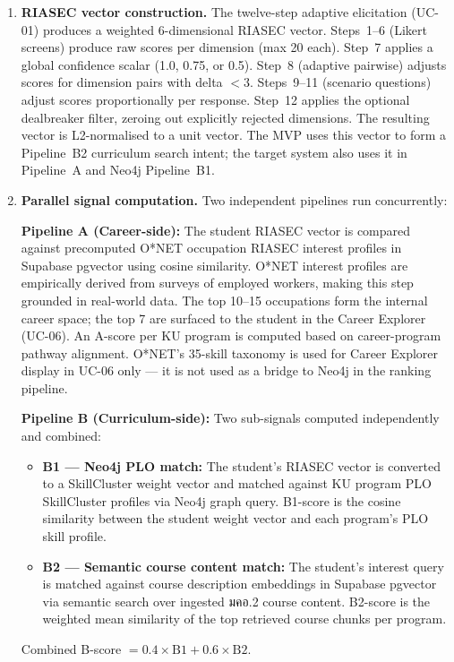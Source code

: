 \begin{enumerate}[leftmargin=80pt]
    \item \textbf{RIASEC vector construction.} The twelve-step adaptive elicitation (UC-01) produces a weighted 6-dimensional RIASEC vector. Steps~1--6 (Likert screens) produce raw scores per dimension (max 20 each). Step~7 applies a global confidence scalar (1.0, 0.75, or 0.5). Step~8 (adaptive pairwise) adjusts scores for dimension pairs with delta $< 3$. Steps~9--11 (scenario questions) adjust scores proportionally per response. Step~12 applies the optional dealbreaker filter, zeroing out explicitly rejected dimensions. The resulting vector is L2-normalised to a unit vector. The MVP uses this vector to form a Pipeline~B2 curriculum search intent; the target system also uses it in Pipeline~A and Neo4j Pipeline~B1.

    \item \textbf{Parallel signal computation.} Two independent pipelines run concurrently:

    \textbf{Pipeline A (Career-side):} The student RIASEC vector is compared against precomputed O*NET occupation RIASEC interest profiles in Supabase pgvector using cosine similarity. O*NET interest profiles are empirically derived from surveys of employed workers, making this step grounded in real-world data. The top 10--15 occupations form the internal career space; the top 7 are surfaced to the student in the Career Explorer (UC-06). An A-score per KU program is computed based on career-program pathway alignment. O*NET's 35-skill taxonomy is used for Career Explorer display in UC-06 only --- it is not used as a bridge to Neo4j in the ranking pipeline.

    \textbf{Pipeline B (Curriculum-side):} Two sub-signals computed independently and combined:
    \begin{itemize}[leftmargin=40pt]
        \item \textbf{B1 --- Neo4j PLO match:} The student's RIASEC vector is converted to a SkillCluster weight vector and matched against KU program PLO SkillCluster profiles via Neo4j graph query. B1-score is the cosine similarity between the student weight vector and each program's PLO skill profile.
        \item \textbf{B2 --- Semantic course content match:} The student's interest query is matched against course description embeddings in Supabase pgvector via semantic search over ingested มคอ.2 course content. B2-score is the weighted mean similarity of the top retrieved course chunks per program.
    \end{itemize}
    Combined B-score $= 0.4 \times \text{B1} + 0.6 \times \text{B2}$.


\end{enumerate}
